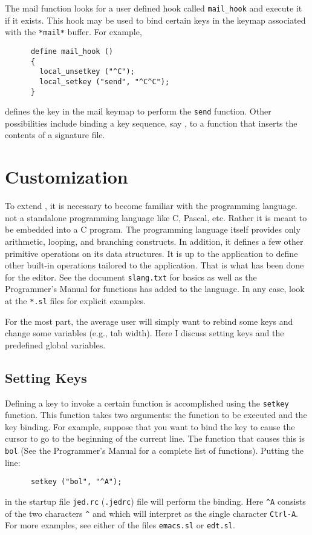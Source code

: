   The mail function looks for a user defined hook called \verb|mail_hook| and
  execute it if it exists.  This hook may be used to bind certain keys in
  the keymap associated with the \verb|*mail*| buffer.  For example,

\begin{verbatim}
      define mail_hook ()
      {
        local_unsetkey ("^C");
        local_setkey ("send", "^C^C");
      }
\end{verbatim}

  defines the key  in the mail keymap to perform the
  \verb|send| function.  Other possibilities include binding a key sequence,
  say , to a function that inserts the contents of a
  signature file.

\section{Customization}

  To extend \jed{}, it is necessary to become familiar with the \slang{}
  programming language.  \slang{} not a standalone programming language like
  C, Pascal, etc. Rather it is meant to be embedded into a C program. The
  \slang{} programming language itself provides only arithmetic, looping, and
  branching constructs.  In addition, it defines a few other primitive
  operations on its data structures.  It is up to the application to define
  other built-in operations tailored to the application.  That is what has
  been done for the \jed{} editor.  See the document \verb|slang.txt| for
  \slang{} basics as well as the \jed{} Programmer's Manual for functions \jed{} has
  added to the language.  In any case, look at the \verb|*.sl| files for
  explicit examples.

  For the most part, the average user will simply want to rebind some keys
  and change some variables (e.g., tab width).  Here I discuss setting keys
  and the predefined global variables.

\subsection{Setting Keys}

  Defining a key to invoke a certain function is accomplished using the
  \verb|setkey| function. This function takes two arguments: the function to
  be executed and the key binding.  For example, suppose that you want to
  bind the key  to cause the cursor to go to the beginning of
  the current line.  The \jed{} function that causes this is \verb|bol| (See
  the \jed{} Programmer's Manual for a complete list of functions).  Putting
  the line:
\begin{verbatim}
      setkey ("bol", "^A");
\end{verbatim}
  in the startup file \verb|jed.rc| (\verb|.jedrc|) file will perform the
  binding.  Here \verb|^A| consists of the two characters \verb|^| and
   which \jed{} will interpret as the single character \verb|Ctrl-A|.
  For more examples, see either of the \slang{} files \verb|emacs.sl| or
  \verb|edt.sl|.
  
